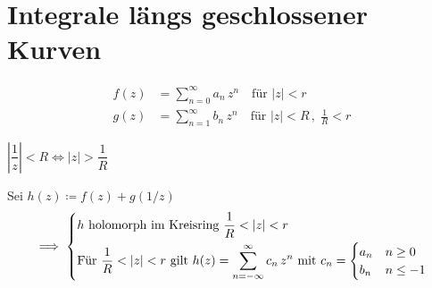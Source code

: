 %

\section{Integrale längs geschlossener Kurven}
\addtocounter{thmn}{1}
\setcounter{theorem}{0}


\begin{example}
  \begin{align*}
    f(z) &= \sum\limits_{n=0}^{\infty} a_n \, z^n \quad \text{für } |z| < r \\
    g(z) &= \sum\limits_{n=1}^{\infty} b_n \, z^n \quad \text{für } |z| < R \, , \; \frac{1}{R} < r
  \end{align*}
  \begin{notice*}[Nebenrechnung:]
    $\left| \dfrac{1}{z} \right| < R \iff |z| > \dfrac{1}{R}$
  \end{notice*}
  Sei $h(z) \coloneq f(z) + g(1/z)$
  \begin{align*}
    \implies
    \begin{dcases}
      h \text{ holomorph im Kreisring } \frac{1}{R} < |z| < r \\
      \text{Für } \frac{1}{R} < |z| < r \text{ gilt } h(z) = \sum\limits_{n=-\infty}^{\infty} c_n \, z^n
      \text{ mit } c_n =
      \begin{cases}
        a_n & n \geq 0 \\
        b_n & n \leq -1
      \end{cases}
    \end{dcases}
  \end{align*}
\end{example}

